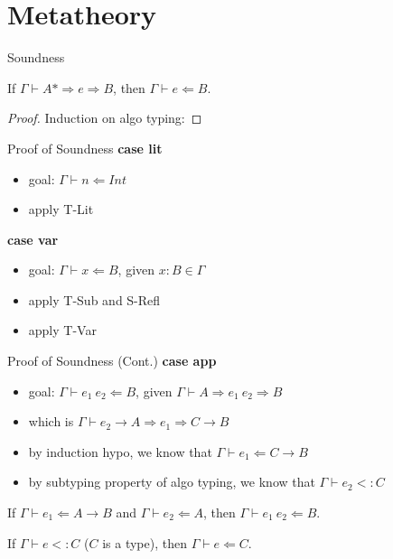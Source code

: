 \documentclass[compress,9pt,aspectratio=169]{beamer}
\begin{document}



\section{Metatheory}

\begin{frame}{Soundness}
\begin{theorem}[Soundness]
If $\Gamma \vdash A* \Rightarrow e \Rightarrow B$, then $\Gamma \vdash e \Leftarrow B.$
\begin{proof}
Induction on algo typing:
\end{proof}
\end{theorem}
\end{frame}

\begin{frame}{Proof of Soundness}
\textbf{case lit}
\begin{itemize}
    \item goal: $\Gamma \vdash n \Leftarrow Int$
    \item apply T-Lit
\end{itemize}
\noindent\makebox[\linewidth]{\rule{\paperwidth}{0.4pt}}
\textbf{case var}
\begin{itemize}
    \item goal: $\Gamma \vdash x \Leftarrow B$, given $x : B \in \Gamma$
    \item apply T-Sub and S-Refl
    \item apply T-Var
\end{itemize}
\end{frame}

\begin{frame}{Proof of Soundness (Cont.)}
\textbf{case app}
\begin{itemize}
    \item goal: $\Gamma \vdash e_1~e_2 \Leftarrow B$, given $\Gamma \vdash A \Rightarrow e_1~e_2 \Rightarrow B$
    \item which is $\Gamma \vdash \boxed{e_2} \rightarrow A \Rightarrow e_1 \Rightarrow C \rightarrow B$
    \item by induction hypo, we know that $\Gamma \vdash e_1 \Leftarrow C \rightarrow B$
    \item by subtyping property of algo typing, we know that $\Gamma \vdash \boxed{e_2} <: C$
\end{itemize}
\noindent\makebox[\linewidth]{\rule{\paperwidth}{0.4pt}}
\begin{lemma}
If $\Gamma \vdash e_1 \Leftarrow A \rightarrow B$ and $\Gamma \vdash e_2 \Leftarrow A$, then $\Gamma \vdash e_1~e_2 \Leftarrow B$.
\end{lemma}
\begin{lemma}
If 	$\Gamma \vdash \boxed{e} <: C$ ($C$ is a type), then $\Gamma \vdash e \Leftarrow C$.
\end{lemma}
\end{frame}
\end{document}
